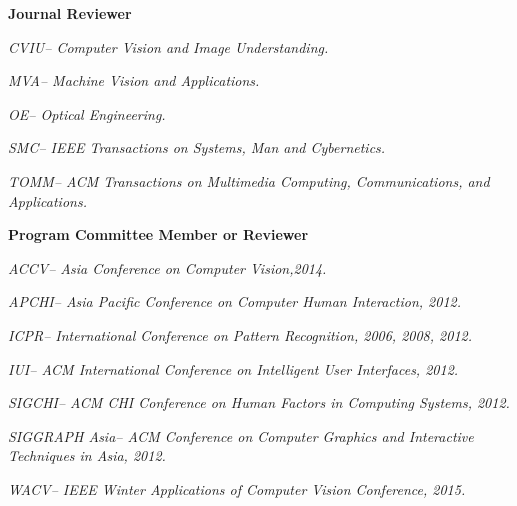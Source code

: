 \documentclass[10pt]{article}
\newcommand{\halfblankline}{\quad\vspace{-0.5\baselineskip}\pagebreak[3]}
\begin{document}
\textbf{Journal Reviewer}
\begin{innerlist}

    \item \emph{CVIU-- Computer Vision and Image Understanding.}
    \item \emph{MVA-- Machine Vision and Applications.}
    \item \emph{OE-- Optical Engineering.}
    \item \emph{SMC-- IEEE Transactions on Systems, Man and Cybernetics.}
    \item \emph{TOMM-- ACM Transactions on Multimedia Computing, Communications, and Applications.}    
\end{innerlist}

\halfblankline

\textbf{Program Committee Member or Reviewer}
\begin{innerlist}
    \item \emph{ACCV-- Asia Conference on Computer Vision,2014.}
    \item \emph{APCHI-- Asia Pacific Conference on Computer Human Interaction, 2012.}
    \item \emph{ICPR-- International Conference on Pattern Recognition, 2006, 2008, 2012.}
    \item \emph{IUI-- ACM International Conference on Intelligent User Interfaces, 2012.}
    \item \emph{SIGCHI-- ACM CHI Conference on Human Factors in Computing Systems, 2012.}
    \item \emph{SIGGRAPH Asia-- ACM Conference on Computer Graphics and Interactive Techniques in Asia, 2012.}
    \item \emph{WACV-- IEEE Winter Applications of Computer Vision Conference, 2015.}
\end{innerlist}

\halfblankline

%
%
\end{document}
